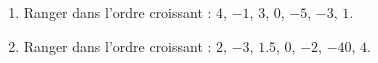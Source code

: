
\begin{exercice}\label{exo2smath-0050}

    \begin{enumerate}
        \item
            Ranger dans l'ordre croissant : \( 4\), \( -1\), \( 3\), \( 0\), \( -5\), \( -3\), \( 1\).
        \item
            Ranger dans l'ordre croissant : \( 2\), \( -3\), \( 1.5\), \( 0\), \( -2\), \( -40\), \( 4\).
    \end{enumerate}

\end{exercice}
